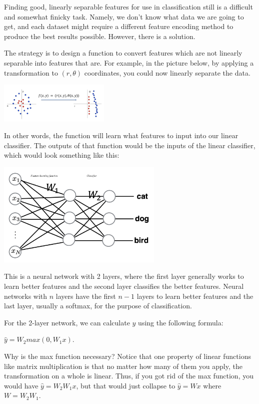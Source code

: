 \documentclass{article}
\begin{document}
Finding good, linearly separable features for use in classification still is a difficult and somewhat finicky task. Namely, we don't know what data we are going to get, and each dataset might require a different feature encoding method to produce the best results possible. However, there is a solution.

The strategy is to design a function to convert features which are not linearly separable into features that are. For example, in the picture below, by applying a transformation to $(r, \theta)$ coordinates, you could now linearly separate the data.

\includegraphics[width=200px]{linearly_separable.png}

In other words, the function will learn what features to input into our linear classifier. The outputs of that function would be the inputs of the linear classifier, which would look something like this:

\includegraphics[width=300px]{neural_network.png}

This is a neural network with 2 layers, where the first layer generally works to learn better features and the second layer classifies the better features. Neural networks with $n$ layers have the first $n-1$ layers to learn better features and the last layer, usually a softmax, for the purpose of classification.

For the 2-layer network, we can calculate $\hat{y}$ using the following formula: 

$\hat{y} = W_2max(0, W_1x)$.

Why is the max function necessary? Notice that one property of linear functions like matrix multiplication is that no matter how many of them you apply, the transformation on a whole is linear. Thus, if you got rid of the max function, you would have $\hat{y} = W_2W_1x$, but that would just collapse to $\hat{y}=Wx$ where $W = W_2W_1$.
\end{document}
